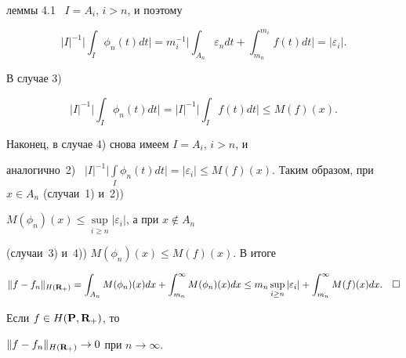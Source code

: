 леммы 4.1 \ $I=A_i$, $i>n$, и поэтому


$$


|I|^{-1}\bigg|\int_I\phi_n(t)dt\bigg|=


m_i^{-1}\bigg|\int_{A_n}\varepsilon_ndt+\int^{m_i}_{m_n}f(t)dt\bigg|


=|\varepsilon_i|.


$$ 


В случае 3)


$$


|I|^{-1}\bigg|\int_I\phi_n(t)dt\bigg|=


|I|^{-1}\bigg|\int_If(t)dt\bigg|\leq M(f)(x).


$$


Наконец, в случае 4) снова имеем $I=A_i$, $i>n$, и


аналогично~2) \ $|I|^{-1}\Big|\int\limits_I\phi_n(t)dt\Big|


=|\varepsilon_i|\leq M(f)(x)$. Таким образом, при $x\in A_n$ (случаи~1) и~2)) 


$M(\phi_n)(x)\leq \sup\limits_{i\geq n}|\varepsilon_i|$, а при $x\notin A_n$ 


(случаи~3) и~4)) $M(\phi_n)(x)\leq M(f)(x)$. В итоге 


$$


\|f-f_n\|_{H({\bold R}_+)}=\int_{A_n}M(\phi_n)(x)dx+


\int^{\infty}_{m_n}M(\phi_n)(x)dx


\leq m_n\sup_{i\geq n}|\varepsilon_i|+\int^{\infty}_{m_n}M(f)(x)dx.


\quad\square


$$








\begin{cors}


Если $f\in H({\bold P},{\bold R}_+)$, то


$\|f-f_n\|_{H({\bold R}_+)}\to 0$ при $n\to\infty$. 


\end{cors}








